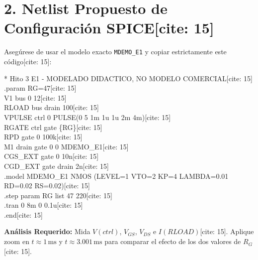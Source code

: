 \documentclass[11pt, a4paper]{article}
\begin{document}
\section*{2. Netlist Propuesto de Configuración SPICE[cite: 15]}
Asegúrese de usar el modelo exacto \texttt{MDEMO\_E1} y copiar estrictamente este código[cite: 15]:
\begin{tcolorbox}[colback=black!5, colframe=black, fontupper=\ttfamily, sharp corners]
* Hito 3 E1 - MODELADO DIDACTICO, NO MODELO COMERCIAL[cite: 15] \\
.param RG=47[cite: 15] \\
V1 bus 0 12[cite: 15] \\
RLOAD bus drain 100[cite: 15] \\
VPULSE ctrl 0 PULSE(0 5 1m 1u 1u 2m 4m)[cite: 15] \\
RGATE ctrl gate \{RG\}[cite: 15] \\
RPD gate 0 100k[cite: 15] \\
M1 drain gate 0 0 MDEMO\_E1[cite: 15] \\
CGS\_EXT gate 0 10n[cite: 15] \\
CGD\_EXT gate drain 2n[cite: 15] \\
.model MDEMO\_E1 NMOS (LEVEL=1 VTO=2 KP=4 LAMBDA=0.01 RD=0.02 RS=0.02)[cite: 15] \\
.step param RG list 47 220[cite: 15] \\
.tran 0 8m 0 0.1u[cite: 15] \\
.end[cite: 15]
\end{tcolorbox}

\textbf{Análisis Requerido:} Mida $V(ctrl)$, $V_{GS}$, $V_{DS}$ e $I(RLOAD)$[cite: 15]. Aplique zoom en $t \approx 1\,\text{ms}$ y $t \approx 3.001\,\text{ms}$ para comparar el efecto de los dos valores de $R_G$[cite: 15].
\end{document}
